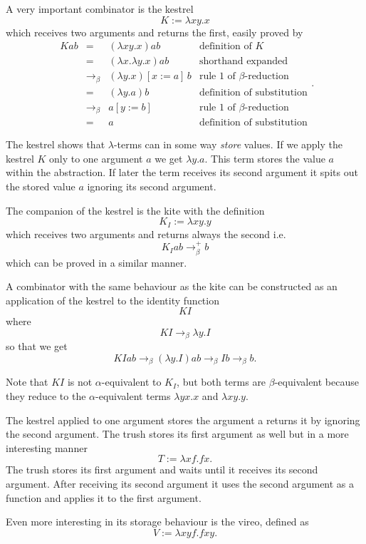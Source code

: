A very important combinator is the kestrel
$$ K := \lambda x y. x$$
which receives two arguments and returns the first, easily proved by
$$\begin{array}{llll}
    K a b & = & (\lambda x y. x) a b & \text{definition of $K$}  \\
          & = &(\lambda x. \lambda y. x) a b & \text{shorthand expanded} \\
          & \to_\beta & (\lambda y.x)[x:=a]\,b & \text{rule 1 of
                                                   $\beta$-reduction}\\
          & = & (\lambda y. a) b & \text{definition of substitution} \\
          & \to_\beta & a[y:=b] & \text{rule 1 of $\beta$-reduction} \\
          & = & a & \text{definition of substitution}
  \end{array}.$$

The kestrel shows that $\lambda$-terms can in some way \emph{store} values. If
we apply the kestrel $K$ only to one argument $a$ we get $\lambda y.a$. This
term stores the value $a$ within the abstraction. If later the term
receives its second argument it spits out the stored value $a$ ignoring its
second argument.

The companion of the kestrel is the kite with the definition
$$ K_I := \lambda x y. y$$ which receives two arguments and returns always the
second i.e.
$$ K_I a b \to_\beta^+ b$$
which can be proved in a similar manner.

A combinator with the same behaviour as the kite can be constructed as an
application of the kestrel to the identity function
$$ K I$$
where
$$ K I \to_\beta \lambda y. I$$
so that we get
$$ K I a b \to_\beta (\lambda y. I) a b \to_\beta I b \to_\beta b.$$

Note that $K I$ is not $\alpha$-equivalent to $K_I$, but both terms are
$\beta$-equivalent because they reduce to the $\alpha$-equivalent terms
$\lambda y x.x$ and $\lambda x y. y$.

The kestrel applied to one argument stores the argument a returns it by ignoring the
second argument. The trush stores its first argument as well but in a more
interesting manner
$$ T := \lambda x f. f x.$$
The trush stores its first argument and waits until it receives its second
argument. After receiving its second argument it uses the second argument as a
function and applies it to the first argument.

Even more interesting in its storage behaviour is the vireo, defined as
$$ V := \lambda x y f. f x y.$$

